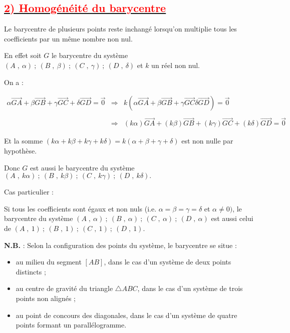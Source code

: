 \documentclass{article}
\begin{document}
		\subsection*{\underline{\textbf{\textcolor{red}{2) Homogénéité du barycentre}}}}
		
		Le barycentre de plusieurs points reste inchangé lorsqu'on multiplie tous les coefficients par un même nombre non nul.
		
		En effet soit $G$ le barycentre du système ${(A\;,\ \alpha)\ ;\ (B\;,\ \beta)\ ;\ (C\;,\ \gamma)\ ;\ (D\;,\ \delta)}$ et $k$ un réel non nul. 

On a :

$\begin{array}{rcl} \alpha\overrightarrow{GA}+\beta\overrightarrow{GB}+\gamma\overrightarrow{GC}+\delta\overrightarrow{GD}=\vec{0}&\Rightarrow & k\left(\alpha\overrightarrow{GA}+\beta\overrightarrow{GB}+\gamma\overrightarrow{GC}\delta\overrightarrow{GD}\right)=\vec{0}\\\\&\Rightarrow & (k\alpha)\overrightarrow{GA}+(k\beta)\overrightarrow{GB}+(k\gamma)\overrightarrow{GC}+(k\delta)\overrightarrow{GD}=\vec{0}\end{array}$

Et la somme $(k\alpha+k\beta+k\gamma+k\delta)=k(\alpha+\beta+\gamma+\delta)$ est non nulle par hypothèse.

Donc $G$ est aussi le barycentre du système ${(A\;,\ k\alpha)\ ;\ (B\;,\ k\beta)\ ;\ (C\;,\ k\gamma)\ ;\ (D\;,\ k\delta)}.$

Cas particulier :

Si tous les coefficients sont égaux et non nuls (i.e. $\alpha=\beta=\gamma=\delta$ et $\alpha\neq 0)$, le barycentre du système ${(A\;,\ \alpha)\ ;\ (B\;,\ \alpha)\ ;\ (C\;,\ \alpha)\ ;\ (D\;,\ \alpha)}$ est aussi celui de ${(A\;,\ 1)\ ;\ (B\;,\ 1)\ ;\ (C\;,\ 1)\ ;\ (D\;,\ 1)}.$

\textbf{N.B.} : Selon la configuration des points du système, le barycentre se situe :
\begin{itemize}
    \item au milieu du segment \([AB]\), dans le cas d'un système de deux points distincts ;
    \item au centre de gravité du triangle \(\triangle ABC\), dans le cas d'un système de trois points non alignés ;
    \item au point de concours des diagonales, dans le cas d'un système de quatre points formant un parallélogramme.
\end{itemize}
\end{document}
